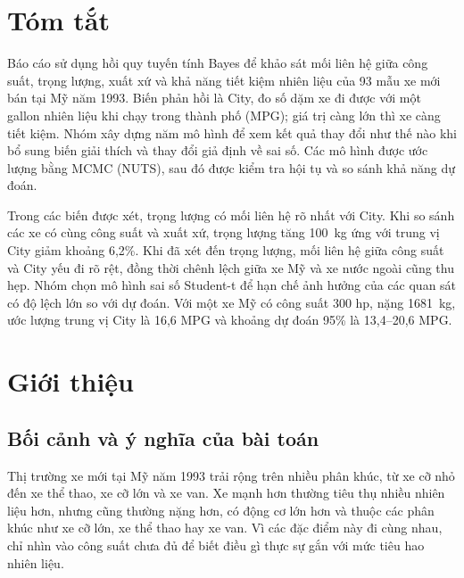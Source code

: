 \documentclass[12pt,a4paper]{report}
\begin{document}
\makereporttitlepage

\chapter*{Tóm tắt}

Báo cáo sử dụng hồi quy tuyến tính Bayes để khảo sát mối liên hệ giữa công
suất, trọng lượng, xuất xứ và khả năng tiết kiệm nhiên liệu của 93 mẫu xe mới
bán tại Mỹ năm 1993. Biến phản hồi là City, đo số dặm xe đi được với một gallon
nhiên liệu khi chạy trong thành phố (MPG); giá trị càng lớn thì xe càng tiết
kiệm. Nhóm xây dựng năm mô hình để xem kết quả thay đổi như thế nào khi bổ sung
biến giải thích và thay đổi giả định về sai số. Các mô hình được ước lượng bằng
MCMC (NUTS), sau đó được kiểm tra hội tụ và so sánh khả năng dự đoán.

Trong các biến được xét, trọng lượng có mối liên hệ rõ nhất với City. Khi so
sánh các xe có cùng công suất và xuất xứ, trọng lượng tăng \SI{100}{kg} ứng với
trung vị City giảm khoảng 6{,}2\%. Khi đã xét đến trọng lượng, mối liên hệ giữa
công suất và City yếu đi rõ rệt, đồng thời chênh lệch giữa xe Mỹ và xe nước
ngoài cũng thu hẹp. Nhóm chọn mô hình sai số Student-t để hạn chế ảnh hưởng của
các quan sát có độ lệch lớn so với dự đoán. Với một xe Mỹ có công suất 300 hp,
nặng \SI{1681}{kg}, ước lượng trung vị City là 16{,}6 MPG và khoảng dự đoán 95\%
là 13{,}4--20{,}6 MPG.

\tableofcontents
\pagebreak

\listoffigures
\listoftables
\newpage

\chapter{Giới thiệu}
\label{sec:intro}

\section{Bối cảnh và ý nghĩa của bài toán}

Thị trường xe mới tại Mỹ năm 1993 trải rộng trên nhiều phân khúc, từ xe cỡ
nhỏ đến xe thể thao, xe cỡ lớn và xe van. Xe mạnh hơn thường tiêu thụ nhiều
nhiên liệu hơn, nhưng cũng thường nặng hơn, có động cơ lớn hơn và thuộc các
phân khúc như xe cỡ lớn, xe thể thao hay xe van. Vì các
đặc điểm này đi cùng nhau, chỉ nhìn vào công suất chưa đủ để biết điều gì thực
sự gắn với mức tiêu hao nhiên liệu.
\end{document}
